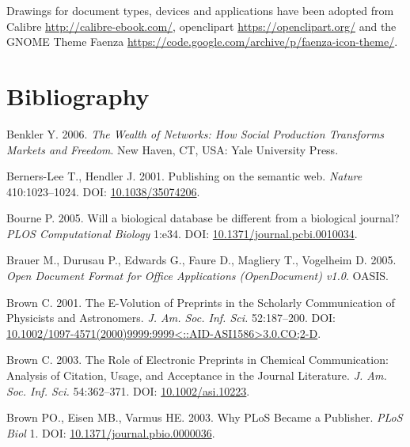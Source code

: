 \documentclass[10pt,fleqn]{wlpeerj}
\begin{document}
Drawings for document types, devices and applications have been adopted
from Calibre \url{http://calibre-ebook.com/}, openclipart
\url{https://openclipart.org/} and the GNOME Theme Faenza
\url{https://code.google.com/archive/p/faenza-icon-theme/}.

\newpage

\section*{Bibliography}\label{bibliography}

\hypertarget{refs}{}
\hypertarget{ref-benklerux5fwealthux5f2006}{}
Benkler Y. 2006. \emph{The Wealth of Networks: How Social Production
Transforms Markets and Freedom}. New Haven, CT, USA: Yale University
Press.

\hypertarget{ref-berners-leeux5fpublishingux5f2001}{}
Berners-Lee T., Hendler J. 2001. Publishing on the semantic web.
\emph{Nature} 410:1023--1024. DOI:
\href{https://doi.org/10.1038/35074206}{10.1038/35074206}.

\hypertarget{ref-bourneux5fdatabaseux5f2005}{}
Bourne P. 2005. Will a biological database be different from a
biological journal? \emph{PLOS Computational Biology} 1:e34. DOI:
\href{https://doi.org/10.1371/journal.pcbi.0010034}{10.1371/journal.pcbi.0010034}.

\hypertarget{ref-ODF}{}
Brauer M., Durusau P., Edwards G., Faure D., Magliery T., Vogelheim D.
2005. \emph{Open Document Format for Office Applications (OpenDocument)
v1.0}. OASIS.

\hypertarget{ref-brownux5fe-volutionux5f2001}{}
Brown C. 2001. The E-Volution of Preprints in the Scholarly
Communication of Physicists and Astronomers. \emph{J. Am. Soc. Inf.
Sci.} 52:187--200. DOI:
\href{https://doi.org/10.1002/1097-4571(2000)9999:9999\%3C::AID-ASI1586\%3E3.0.CO;2-D}{10.1002/1097-4571(2000)9999:9999\textless{}::AID-ASI1586\textgreater{}3.0.CO;2-D}.

\hypertarget{ref-brownux5froleux5f2003}{}
Brown C. 2003. The Role of Electronic Preprints in Chemical
Communication: Analysis of Citation, Usage, and Acceptance in the
Journal Literature. \emph{J. Am. Soc. Inf. Sci.} 54:362--371. DOI:
\href{https://doi.org/10.1002/asi.10223}{10.1002/asi.10223}.

\hypertarget{ref-brownux5fwhyux5f2003}{}
Brown PO., Eisen MB., Varmus HE. 2003. Why PLoS Became a Publisher.
\emph{PLoS Biol} 1. DOI:
\href{https://doi.org/10.1371/journal.pbio.0000036}{10.1371/journal.pbio.0000036}.
\end{document}
